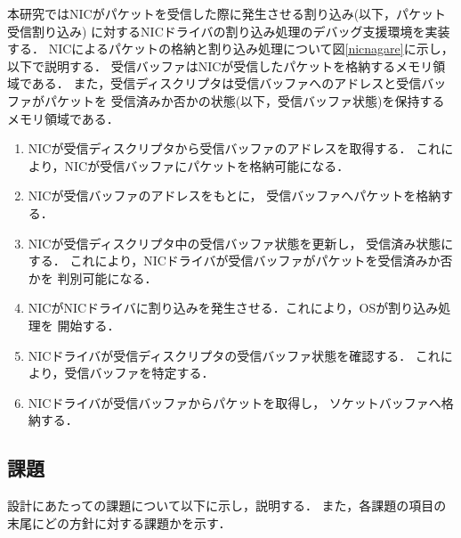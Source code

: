 \documentclass[submit,techreq,noauthor,dvipdfmx]{ipsj}
\begin{document}
本研究ではNICがパケットを受信した際に発生させる割り込み(以下，パケット受信割り込み)
に対するNICドライバの割り込み処理のデバッグ支援環境を実装する．
NICによるパケットの格納と割り込み処理について図\ref{nicnagare}に示し，以下で説明する．
受信バッファはNICが受信したパケットを格納するメモリ領域である．
また，受信ディスクリプタは受信バッファへのアドレスと受信バッファがパケットを
受信済みか否かの状態(以下，受信バッファ状態)を保持するメモリ領域である．
\begin{enumerate}
    \item 
        NICが受信ディスクリプタから受信バッファのアドレスを取得する．
        これにより，NICが受信バッファにパケットを格納可能になる．
    \item 
        NICが受信バッファのアドレスをもとに，
        受信バッファへパケットを格納する．
    \item 
        NICが受信ディスクリプタ中の受信バッファ状態を更新し，
        受信済み状態にする．
        これにより，NICドライバが受信バッファがパケットを受信済みか否かを
        判別可能になる．
    \item 
        NICがNICドライバに割り込みを発生させる．これにより，OSが割り込み処理を
        開始する．
    \item 
        NICドライバが受信ディスクリプタの受信バッファ状態を確認する．
        これにより，受信バッファを特定する．
    \item 
        NICドライバが受信バッファからパケットを取得し，
        ソケットバッファへ格納する．
\end{enumerate}

\subsection{課題}\label{sec:challenge}

設計にあたっての課題について以下に示し，説明する．
また，各課題の項目の末尾にどの方針に対する課題かを示す．
\end{document}
